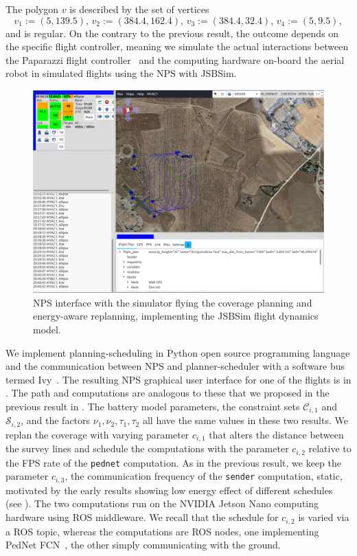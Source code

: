 The polygon $v$ is described by the set of vertices
\begin{equation}
  v_1:=(5,139.5),\,v_2:=(384.4,162.4),\,v_3:=(384.4,32.4),\,v_4:=(5,9.5),
\end{equation}
and is regular. 
On the contrary to the previous result, the outcome depends on the specific flight controller, meaning we simulate the actual interactions between the Paparazzi flight controller~\citep{papa} and the computing hardware on-board the aerial robot in simulated flights using the NPS with JSBSim. 
\begin{figure}[h!]
  \centering
  \includegraphics[width=.7\textwidth]{pictures/paparazzi}
  \caption[NPS with the simulator flying the coverage planning and energy-aware replanning]{NPS interface with the simulator flying the coverage planning and energy-aware replanning, implementing the JSBSim flight dynamics model.}   
  \label{fig:pprz-screen}
\end{figure}
We implement planning-scheduling in Python open source programming language and the communication between NPS and planner-scheduler with a software bus termed Ivy~\citep{ivybus}. The resulting NPS graphical user interface for one of the flights is in . The path and computations are analogous to these that we proposed in the previous result in . The battery model parameters, the constraint sets $\mathcal{C}_{i,1}$ and $\mathcal{S}_{i,2}$, and the factors $\nu_1,\nu_2,\tau_1,\tau_2$ all have the same values in these two results. We replan the coverage with varying parameter $c_{i,1}$ that alters the distance between the survey lines and schedule the computations with the parameter $c_{i,2}$ relative to the FPS rate of the {\small\tt pednet} computation. As in the previous result, we keep the parameter $c_{i,3}$, the communication frequency of the {\small\tt sender} computation, static, motivated by the early results showing low energy effect of different schedules (see ). The two computations run on the NVIDIA Jetson Nano computing hardware using ROS middleware. We recall that the schedule for $c_{i,2}$ is varied via a ROS topic, whereas the computations are ROS nodes, one implementing PedNet FCN~\citep{ullah2018pednet}, the other simply communicating with the ground.


